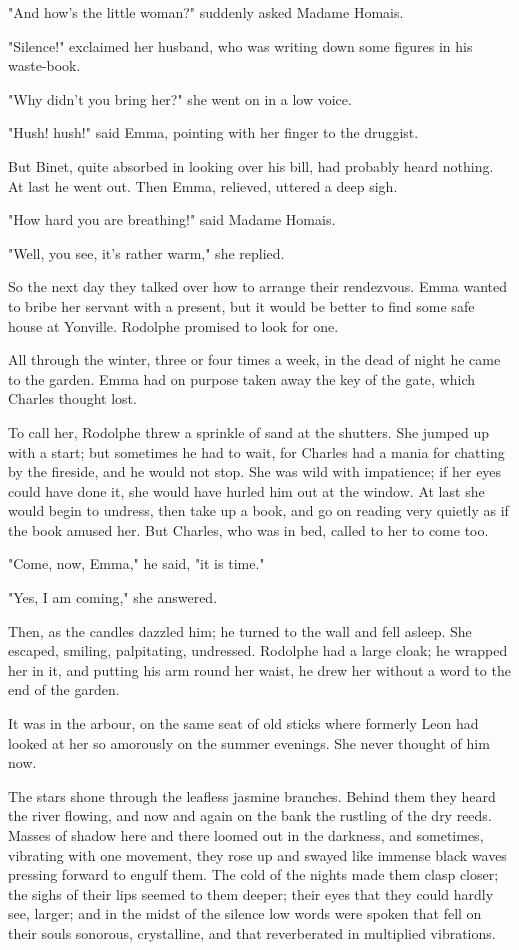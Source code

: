 \documentclass[11pt,twocolumn]{ltugboat}
\begin{document}
"And how's the little woman?" suddenly asked Madame Homais.

"Silence!" exclaimed her husband, who was writing down some figures in
his waste-book.

"Why didn't you bring her?" she went on in a low voice.

"Hush! hush!" said Emma, pointing with her finger to the druggist.

But Binet, quite absorbed in looking over his bill, had probably heard
nothing. At last he went out. Then Emma, relieved, uttered a deep sigh.

"How hard you are breathing!" said Madame Homais.

"Well, you see, it's rather warm," she replied.

So the next day they talked over how to arrange their rendezvous. Emma
wanted to bribe her servant with a present, but it would be better to
find some safe house at Yonville. Rodolphe promised to look for one.

All through the winter, three or four times a week, in the dead of night
he came to the garden. Emma had on purpose taken away the key of the
gate, which Charles thought lost.

To call her, Rodolphe threw a sprinkle of sand at the shutters. She
jumped up with a start; but sometimes he had to wait, for Charles had a
mania for chatting by the fireside, and he would not stop. She was wild
with impatience; if her eyes could have done it, she would have hurled
him out at the window. At last she would begin to undress, then take up
a book, and go on reading very quietly as if the book amused her. But
Charles, who was in bed, called to her to come too.

"Come, now, Emma," he said, "it is time."

"Yes, I am coming," she answered.

Then, as the candles dazzled him; he turned to the wall and fell asleep.
She escaped, smiling, palpitating, undressed. Rodolphe had a large
cloak; he wrapped her in it, and putting his arm round her waist, he
drew her without a word to the end of the garden.

It was in the arbour, on the same seat of old sticks where formerly Leon
had looked at her so amorously on the summer evenings. She never thought
of him now.

The stars shone through the leafless jasmine branches. Behind them they
heard the river flowing, and now and again on the bank the rustling
of the dry reeds. Masses of shadow here and there loomed out in the
darkness, and sometimes, vibrating with one movement, they rose up and
swayed like immense black waves pressing forward to engulf them. The
cold of the nights made them clasp closer; the sighs of their lips
seemed to them deeper; their eyes that they could hardly see, larger;
and in the midst of the silence low words were spoken that fell on
their souls sonorous, crystalline, and that reverberated in multiplied
vibrations.
\end{document}

